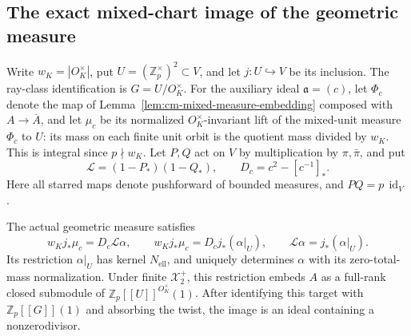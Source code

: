 \subsection{The exact mixed-chart image of the geometric measure}
\label{subsec:cm-measure-image}

Write \(w_K=|O_K^\times|\), put \(U=(\mathbb Z_p^\times)^2\subset V\), and let
\(j:U\hookrightarrow V\) be its inclusion.
The ray-class identification is
\(G=U/O_K^\times\).  For the auxiliary ideal
\(\mathfrak a=(c)\), let \(\Phi_c\) denote the map of Lemma~\ref{lem:cm-mixed-measure-embedding} composed with \(A\to\overline A\), and let \(\mu_c\) be its normalized
\(O_K^\times\)-invariant lift of the mixed-unit
measure \(\Phi_c\) to \(U\): its mass on each finite
unit orbit is the quotient mass divided by \(w_K\).
This is integral since \(p\nmid w_K\).
Let \(P,Q\) act on \(V\) by multiplication by
\(\pi,\bar\pi\), and put
\[
 \mathcal L=(1-P_*)(1-Q_*),\qquad
 D_c=c^2-[c^{-1}]_*.
\]
Here all starred maps denote pushforward of bounded
measures, and \(PQ=p\,\operatorname{id}_V\).

\begin{lemma}\label{lem:cm-measure-euler-image}
The actual geometric measure satisfies
\[
 w_Kj_*\mu_c=D_c\mathcal L\alpha,\qquad
 w_Kj_*\mu_c=D_cj_*(\alpha|_U),\qquad
 \mathcal L\alpha=j_*(\alpha|_U).
\]
Its restriction \(\alpha|_U\) has kernel
\(N_{\mathrm{ell}}\), and uniquely determines
\(\alpha\) with its zero-total-mass normalization.
Under finite \(\mathcal X_2^+\), this restriction
embeds \(A\) as a full-rank closed submodule of
\(\mathbb Z_p[[U]]^{O_K^\times}(1)\).
After identifying this target with
\(\mathbb Z_p[[G]](1)\) and absorbing the twist,
the image is an ideal containing a nonzerodivisor.
\end{lemma}

